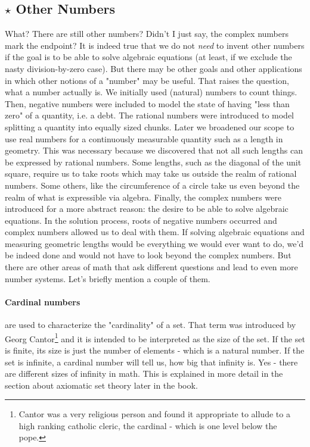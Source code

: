 
\subsection{$\star$ Other Numbers}
What? There are still other numbers? Didn't I just say, the complex numbers mark the endpoint? It is indeed true that we do not \emph{need} to invent other numbers if the goal is to be able to solve algebraic equations (at least, if we exclude the nasty division-by-zero case). But there may be other goals and other applications in which other notions of a "number" may be useful. That raises the question, what a number actually is. We initially used (natural) numbers to count things. Then, negative numbers were included to model the state of having "less than zero" of a quantity, i.e. a debt. The rational numbers were introduced to model splitting a quantity into equally sized chunks. Later we broadened our scope to use real numbers for a continuously measurable quantity such as a length in geometry. This was necessary because we discovered that not all such lengths can be expressed by rational numbers. Some lengths, such as the diagonal of the unit square, require us to take roots which may take us outside the realm of rational numbers. Some others, like the circumference of a circle take us even beyond the realm of what is expressible via algebra. Finally, the complex numbers were introduced for a more abstract reason: the desire to be able to solve algebraic equations. In the solution process, roots of negative numbers occurred and complex numbers allowed us to deal with them. If solving algebraic equations and measuring geometric lengths would be everything we would ever want to do, we'd be indeed done and would not have to look beyond the complex numbers. But there are other areas of math that ask different questions and lead to even more number systems. Let's briefly mention a couple of them.


\paragraph{Cardinal numbers} are used to characterize the "cardinality" of a set. That term was introduced by Georg Cantor\footnote{Cantor was a very religious person and found it appropriate to allude to a high ranking catholic cleric, the cardinal - which is one level below the pope.} and it is intended to be interpreted as the size of the set. If the set is finite, its size is just the number of elements - which is a natural number. If the set is infinite, a cardinal number will tell us, how big that infinity is. Yes - there are different sizes of infinity in math. This is explained in more detail in the section about axiomatic set theory later in the book. 

